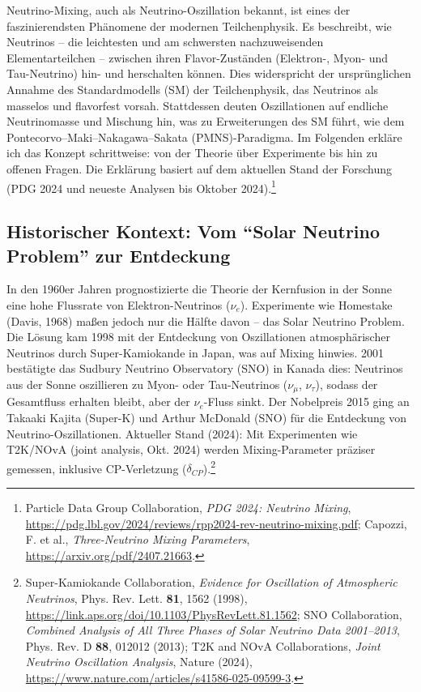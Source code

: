 	Neutrino-Mixing, auch als Neutrino-Oszillation bekannt, ist eines der faszinierendsten Phänomene der modernen Teilchenphysik. Es beschreibt, wie Neutrinos -- die leichtesten und am schwersten nachzuweisenden Elementarteilchen -- zwischen ihren Flavor-Zuständen (Elektron-, Myon- und Tau-Neutrino) hin- und herschalten können. Dies widerspricht der ursprünglichen Annahme des Standardmodells (SM) der Teilchenphysik, das Neutrinos als masselos und flavorfest vorsah. Stattdessen deuten Oszillationen auf endliche Neutrinomasse und Mischung hin, was zu Erweiterungen des SM führt, wie dem Pontecorvo--Maki--Nakagawa--Sakata (PMNS)-Paradigma. Im Folgenden erkläre ich das Konzept schrittweise: von der Theorie über Experimente bis hin zu offenen Fragen. Die Erklärung basiert auf dem aktuellen Stand der Forschung (PDG 2024 und neueste Analysen bis Oktober 2024).\footnote{Particle Data Group Collaboration, \emph{PDG 2024: Neutrino Mixing}, \url{https://pdg.lbl.gov/2024/reviews/rpp2024-rev-neutrino-mixing.pdf}; Capozzi, F. et al., \emph{Three-Neutrino Mixing Parameters}, \url{https://arxiv.org/pdf/2407.21663}.}
	
	\subsection{Historischer Kontext: Vom ``Solar Neutrino Problem'' zur Entdeckung}
	
	In den 1960er Jahren prognostizierte die Theorie der Kernfusion in der Sonne eine hohe Flussrate von Elektron-Neutrinos ($\nu_e$). Experimente wie Homestake (Davis, 1968) maßen jedoch nur die Hälfte davon -- das Solar Neutrino Problem. Die Lösung kam 1998 mit der Entdeckung von Oszillationen atmosphärischer Neutrinos durch Super-Kamiokande in Japan, was auf Mixing hinwies. 2001 bestätigte das Sudbury Neutrino Observatory (SNO) in Kanada dies: Neutrinos aus der Sonne oszillieren zu Myon- oder Tau-Neutrinos ($\nu_\mu$, $\nu_\tau$), sodass der Gesamtfluss erhalten bleibt, aber der $\nu_e$-Fluss sinkt. Der Nobelpreis 2015 ging an Takaaki Kajita (Super-K) und Arthur McDonald (SNO) für die Entdeckung von Neutrino-Oszillationen. Aktueller Stand (2024): Mit Experimenten wie T2K/NOvA (joint analysis, Okt. 2024) werden Mixing-Parameter präziser gemessen, inklusive CP-Verletzung ($\delta_{CP}$).\footnote{Super-Kamiokande Collaboration, \emph{Evidence for Oscillation of Atmospheric Neutrinos}, Phys. Rev. Lett. \textbf{81}, 1562 (1998), \url{https://link.aps.org/doi/10.1103/PhysRevLett.81.1562}; SNO Collaboration, \emph{Combined Analysis of All Three Phases of Solar Neutrino Data 2001--2013}, Phys. Rev. D \textbf{88}, 012012 (2013); T2K and NOvA Collaborations, \emph{Joint Neutrino Oscillation Analysis}, Nature (2024), \url{https://www.nature.com/articles/s41586-025-09599-3}.}
	

